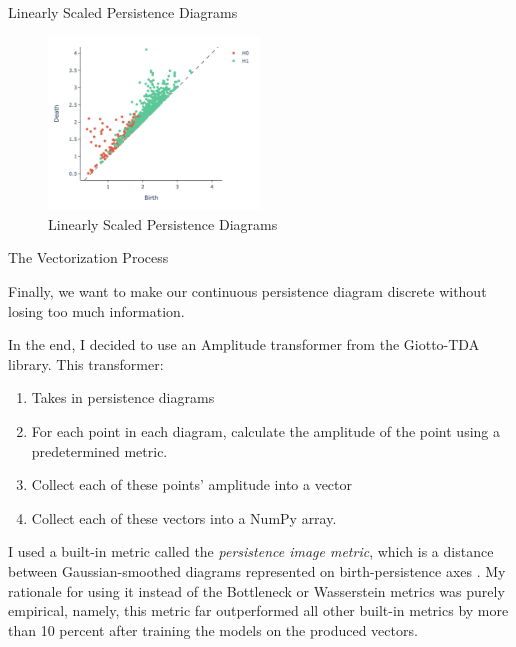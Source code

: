\documentclass[11pt]{beamer}
\begin{document}
\begin{frame}{Linearly Scaled Persistence Diagrams}
    \begin{figure}
        \caption{Linearly Scaled Persistence Diagrams}
        \centering
        \includegraphics[width=0.5\textwidth]{imagens/persistence_diagrams.png}
        
        \medskip
        
    \end{figure}
\end{frame}

\begin{frame}{The Vectorization Process}
    \par Finally, we want to make our continuous persistence diagram discrete without losing too much information.
    \vspace{3mm}
    \par In the end, I decided to use an Amplitude transformer from the Giotto-TDA library. This transformer:
    \begin{enumerate}
        \item Takes in persistence diagrams
        \item For each point in each diagram, calculate the amplitude of the point using a predetermined metric.
        \item Collect each of these points' amplitude into a vector
        \item Collect each of these vectors into a NumPy array.
    \end{enumerate}
    
    \vspace{2mm}

    \par I used a built-in metric called the \textit{persistence image metric}, which is a distance between Gaussian-smoothed diagrams represented on birth-persistence axes \cite{persistenceImageMetric}. My rationale for using it instead of the Bottleneck or Wasserstein metrics was purely empirical, namely, this metric far outperformed all other built-in metrics by more than 10 percent after training the models on the produced vectors.

\end{frame}
\end{document}
